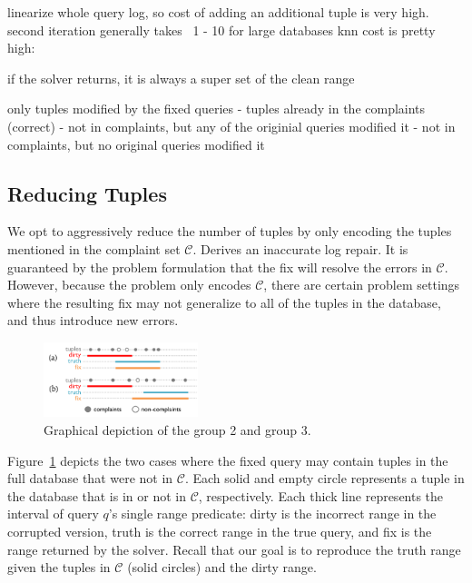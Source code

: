 linearize whole query log, so cost of adding an additional tuple is very high.
second iteration generally takes ~1 - 10%
for large databases knn cost is pretty high: ~

if the solver returns, it is always a super set of the clean range

only tuples modified by the fixed queries
- tuples already in the complaints (correct)
- not in complaints, but any of the originial queries modified it
- not in complaints, but no original queries modified it



\subsection{Reducing Tuples}
\label{sec:opt:tbsize}

We opt to aggressively reduce the number of tuples by only encoding the tuples
mentioned in the complaint set $\mathcal{C}$.
Derives an inaccurate log repair.  It is guaranteed by the problem formulation
that the fix will resolve the errors in $\mathcal{C}$.  However, because the problem
only encodes $\mathcal{C}$, there are certain problem settings where 
the resulting fix may not generalize to all of the tuples in the database, 
and thus introduce new errors.    

\begin{figure}[h]
    \centering
    \includegraphics[width=0.4\textwidth]{figures/2nditerationgroups}
    \caption{Graphical depiction of the group 2 and group 3. }
    \label{fig:groups}
\end{figure}

Figure~\ref{fig:groups} depicts the two cases where the fixed query may contain tuples in the full
database that were not in $\mathcal{C}$.
Each solid and empty circle represents a tuple in the database that is in or not in $\mathcal{C}$, respectively.  
Each thick line represents the interval of query $q$'s single range predicate: 
dirty is the incorrect range in the corrupted version,
truth is the correct range in the true query, 
and fix is the range returned by the solver.
Recall that our goal is to reproduce the truth range given the tuples in $\mathcal{C}$ (solid circles)
and the dirty range.  

